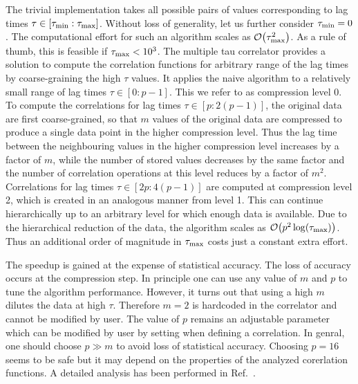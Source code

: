 The trivial implementation takes all possible pairs of values
corresponding to lag times $\tau \in [\taumin:\taumax]$. 
Without loss of generality, let us further consider $\taumin=0$.
The computational effort for such an algorithm scales
as ${\cal O} \bigl(\taumax^2\bigr)$.
As a rule of thumb, this is feasible if $\taumax < 10^3$.
The multiple tau correlator provides a solution to compute the
correlation functions for arbitrary range of the lag times by
coarse-graining the high $\tau$ values. It applies the naive algorithm
to a relatively small range of lag times $\tau \in [0:p-1]$. This we refer
to as compression level 0. To compute the correlations for lag times
$\tau \in [p:2(p-1)]$, the original data are first coarse-grained, so
that $m$ values of the original data are compressed to produce a single
data point in the higher compression level. Thus the lag time between
the neighbouring values in the higher compression level increases
by a factor of $m$, while the number of stored values decreases by
the same factor and the number of correlation operations at this level
reduces by a factor of $m^2$. Correlations for lag times 
$\tau \in [2p:4(p-1)]$ are computed at compression level 2, which is created
in an analogous manner from level 1. This can continue hierarchically
up to an arbitrary level for which enough data is available. Due to the
hierarchical reduction of the data, the algorithm scales as 
${\cal O} \bigl( p^2 \log(\taumax) \bigr)$. Thus an additional order
of magnitude in $\taumax$ costs just a constant extra effort.

The speedup is gained at the expense of statistical accuracy.
The loss of accuracy occurs at the compression step.
In principle one can use any value of $m$ and $p$ to tune the algorithm
performance. However, it turns out that using a high $m$ dilutes the
data at high $\tau$. Therefore $m=2$ is hardcoded in the \es correlator
and cannot be modified by user. The value of $p$ remains an adjustable
parameter which can be modified by user by setting 
when defining a correlation. In genral, one should choose $p \gg m$
to avoid loss of statistical accuracy. Choosing $p=16$ seems to be
safe but it may depend on the properties of the analyzed
corerlation functions. A detailed analysis has been performed
in Ref.~\cite{ramirez10a}.

